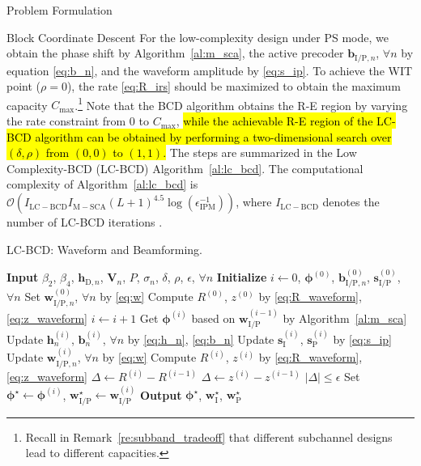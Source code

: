 \documentclass[journal,12pt,onecolumn,draftclsnofoot]{IEEEtran}
\begin{document}
\begin{section}{Problem Formulation}
\begin{subsection}{Block Coordinate Descent}
			For the low-complexity design under PS mode, we obtain the phase shift by Algorithm~\ref{al:m_sca}, the active precoder $\boldsymbol{b}_{\mathrm{I/P},n}$, $\forall n$ by equation \eqref{eq:b_n}, and the waveform amplitude by \eqref{eq:s_ip}. To achieve the WIT point ($\rho=0$), the rate \eqref{eq:R_irs} should be maximized to obtain the maximum capacity $C_{\max}$.\footnote{Recall in Remark~\ref{re:subband_tradeoff} that different subchannel designs lead to different capacities.} Note that the BCD algorithm obtains the R-E region by varying the rate constraint from \num{0} to $C_{\max}$, \hl{while the achievable R-E region of the LC-BCD algorithm can be obtained by performing a two-dimensional search over $(\delta, \rho)$ from $(0, 0)$ to $(1, 1)$.} The steps are summarized in the Low Complexity-BCD (LC-BCD) Algorithm~\ref{al:lc_bcd}. The computational complexity of Algorithm~\ref{al:lc_bcd} is $\mathcal{O}\left(I_{\mathrm{LC-BCD}}I_{\mathrm{M-SCA}}(L+1)^{4.5} \log(\epsilon_{\mathrm{IPM}}^{-1})\right)$, where $I_{\mathrm{LC-BCD}}$ denotes the number of LC-BCD iterations \cite{Luo2010}.

			\begin{algorithm}[!t]
				\caption{LC-BCD: Waveform and Beamforming.}
				\label{al:lc_bcd}
				\begin{algorithmic}[1]
					\State \textbf{Input} $\beta_2$, $\beta_4$, $\boldsymbol{h}_{\mathrm{D},n}$, $\boldsymbol{V}_{n}$, $P$, $\sigma_n$, $\delta$, $\rho$, $\epsilon$, $\forall n$
					\State \textbf{Initialize} $i \gets 0$, $\boldsymbol{\phi}^{(0)}$, $\boldsymbol{b}_{\mathrm{I/P},n}^{(0)}$, $\boldsymbol{s}_{\mathrm{I/P}}^{(0)}$, $\forall n$
					\State Set $\boldsymbol{w}_{\mathrm{I/P},n}^{(0)}$, $\forall n$ by \eqref{eq:w}
					\State Compute $R^{(0)}$, $z^{(0)}$ by \eqref{eq:R_waveform}, \eqref{eq:z_waveform}
					\Repeat
						\State $i \gets i + 1$
						\State Get $\boldsymbol{\phi}^{(i)}$ based on $\boldsymbol{w}_{\mathrm{I/P}}^{(i-1)}$ by Algorithm~\ref{al:m_sca}
						\State Update $\boldsymbol{h}_n^{(i)}$, $\boldsymbol{b}_n^{(i)}$, $\forall n$ by \eqref{eq:h_n}, \eqref{eq:b_n}
						\State Update $\boldsymbol{s}_{\mathrm{I}}^{(i)}$, $\boldsymbol{s}_{\mathrm{P}}^{(i)}$ by \eqref{eq:s_ip}
						\State Update $\boldsymbol{w}_{\mathrm{I/P},n}^{(i)}$, $\forall n$ by \eqref{eq:w}
						\State Compute $R^{(i)}$, $z^{(i)}$ by \eqref{eq:R_waveform}, \eqref{eq:z_waveform}
							\State $\Delta \gets R^{(i)} - R^{(i-1)}$
						\Else
							\State $\Delta \gets z^{(i)} - z^{(i-1)}$
						\EndIf
					\Until $\lvert \Delta \rvert \le \epsilon$
					\State Set $\boldsymbol{\phi}^{\star} \gets \boldsymbol{\phi}^{(i)}$, $\boldsymbol{w}_{\mathrm{I/P}}^{\star} \gets \boldsymbol{w}_{\mathrm{I/P}}^{(i)}$
					\State \textbf{Output} $\boldsymbol{\phi}^{\star}$, $\boldsymbol{w}_{\mathrm{I}}^{\star}$, $\boldsymbol{w}_{\mathrm{P}}^{\star}$
				\end{algorithmic}
			\end{algorithm}
		\end{subsection}
	\end{section}
\end{document}
